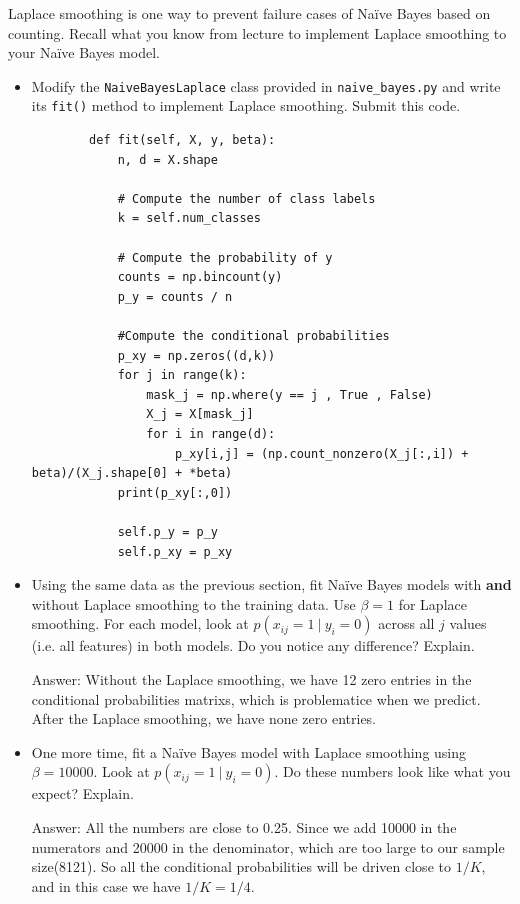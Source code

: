 \documentclass{article}
\newcommand{\blu}[1]{{\textcolor{blu}{#1}}}
\newenvironment{answer}{\par\begingroup\color{gre}Answer: }{\endgroup}
\let\ask\blu
\begin{document}
    Laplace smoothing is one way to prevent failure cases of Na\"ive Bayes based on counting. Recall what you know from lecture to implement Laplace smoothing to your Na\"ive Bayes model.
    \begin{itemize}
        \item Modify the \texttt{NaiveBayesLaplace} class provided in \texttt{naive\_bayes.py} and write its \texttt{fit()} method to implement Laplace smoothing. \ask{Submit this code.}
        \begin{verbatim}
        def fit(self, X, y, beta):
            n, d = X.shape

            # Compute the number of class labels
            k = self.num_classes

            # Compute the probability of y
            counts = np.bincount(y)
            p_y = counts / n

            #Compute the conditional probabilities 
            p_xy = np.zeros((d,k))
            for j in range(k):
                mask_j = np.where(y == j , True , False)
                X_j = X[mask_j]
                for i in range(d):
                    p_xy[i,j] = (np.count_nonzero(X_j[:,i]) + beta)/(X_j.shape[0] + *beta)
            print(p_xy[:,0])

            self.p_y = p_y
            self.p_xy = p_xy
        \end{verbatim}
        
        \item Using the same data as the previous section, fit Na\"ive Bayes models with \textbf{and} without Laplace smoothing to the training data. Use $\beta=1$ for Laplace smoothing. For each model, look at $p(x_{ij} = 1 \ | \ y_i = 0)$ across all $j$ values (i.e. all features) in both models. \ask{Do you notice any difference? Explain.}
        \begin{answer}
            Without the Laplace smoothing, we have 12 zero entries in the conditional probabilities matrixs, which is problematice when we predict. After the Laplace smoothing, we have none zero entries.
        \end{answer}
        \item One more time, fit a Na\"ive Bayes model with Laplace smoothing using $\beta=10000$. Look at $p(x_{ij} = 1 \ | \ y_i = 0)$. \ask{Do these numbers look like what you expect? Explain.}
        \begin{answer}
            All the numbers are close to 0.25. Since we add 10000 in the numerators and 20000 in the denominator, which are too large to our sample size(8121). So all the conditional probabilities will be driven close to $1/K$, and in this case we have $1/K = 1/4$.
        \end{answer}
    \end{itemize}
\end{document}
